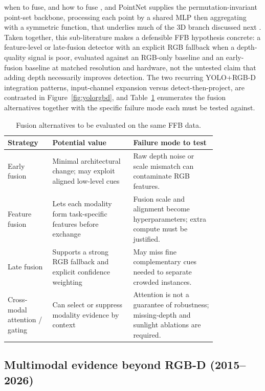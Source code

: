 when to fuse, and how to fuse \cite{feng2021multimodalsurvey}, and PointNet supplies the permutation-invariant point-set backbone, processing each point by a shared MLP then aggregating with a symmetric function, that underlies much of the 3D branch discussed next \cite{qi2017pointnet}. Taken together, this sub-literature makes a defensible FFB hypothesis concrete: a feature-level or late-fusion detector with an explicit RGB fallback when a depth-quality signal is poor, evaluated against an RGB-only baseline and an early-fusion baseline at matched resolution and hardware, not the untested claim that adding depth necessarily improves detection. The two recurring YOLO+RGB-D integration patterns, input-channel expansion versus detect-then-project, are contrasted in Figure~\ref{fig:yolorgbd}, and Table~\ref{tab:fusion} enumerates the fusion alternatives together with the specific failure mode each must be tested against.

\begin{table}[t]
\centering\small
\caption{Fusion alternatives to be evaluated on the same FFB data.}
\label{tab:fusion}
\begin{tabular}{p{0.16\linewidth}p{0.32\linewidth}p{0.33\linewidth}}
\toprule
Strategy & Potential value & Failure mode to test \\
\midrule
Early fusion & Minimal architectural change; may exploit aligned low-level cues & Raw depth noise or scale mismatch can contaminate RGB features. \\
Feature fusion & Lets each modality form task-specific features before exchange & Fusion scale and alignment become hyperparameters; extra compute must be justified. \\
Late fusion & Supports a strong RGB fallback and explicit confidence weighting & May miss fine complementary cues needed to separate crowded instances. \\
Cross-modal attention / gating & Can select or suppress modality evidence by context & Attention is not a guarantee of robustness; missing-depth and sunlight ablations are required. \\
\bottomrule
\end{tabular}
\end{table}



\subsection{Multimodal evidence beyond RGB-D (2015--2026)}

